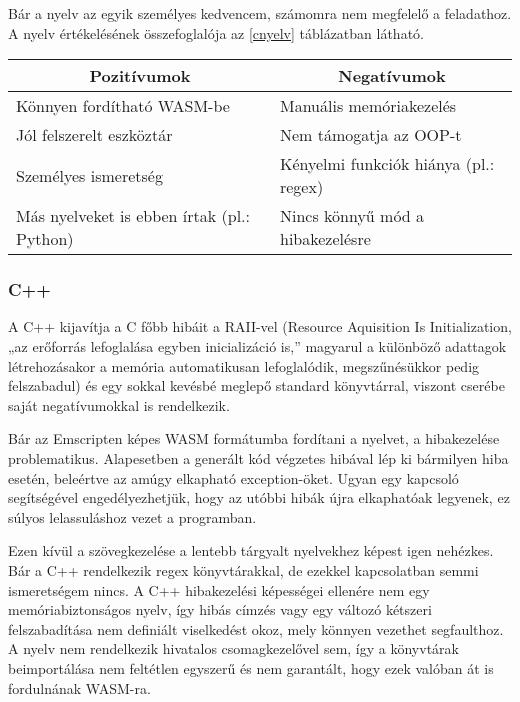 Bár a nyelv az egyik személyes kedvencem, számomra nem megfelelő a feladathoz. A nyelv értékelésének összefoglalója az \ref{cnyelv} táblázatban látható.

\begin{center}
  \begin{tabularx}{\textwidth}{X X}
    \hline
    \multicolumn{1}{c}{\bfseries{Pozitívumok}} & \multicolumn{1}{c}{\bfseries{Negatívumok}}                                  \\
    \hline
    Könnyen fordítható WASM-be                 & Manuális memóriakezelés                                                     \\
    Jól felszerelt eszköztár                   & Nem támogatja az OOP-t \\
    Személyes ismeretség                       & Kényelmi funkciók hiánya (pl.: regex) \\
    Más nyelveket is ebben írtak (pl.: Python) & Nincs könnyű mód a hibakezelésre \\
    \hline
  \end{tabularx}
\end{center}

\subsubsection{C++}

A C++ kijavítja a C főbb hibáit a RAII-vel (Resource Aquisition Is Initialization\cite{raii}, „az erőforrás lefoglalása egyben inicializáció is,” magyarul a különböző adattagok létrehozásakor a memória automatikusan lefoglalódik, megszűnésükkor pedig felszabadul) és egy sokkal kevésbé meglepő standard könyvtárral, viszont cserébe saját negatívumokkal is rendelkezik.

Bár az Emscripten képes WASM formátumba fordítani a nyelvet, a hibakezelése problematikus. Alapesetben a generált kód végzetes hibával lép ki bármilyen hiba esetén, beleértve az amúgy elkapható exception-öket. Ugyan egy kapcsoló segítségével engedélyezhetjük, hogy az utóbbi hibák újra elkaphatóak legyenek, ez súlyos lelassuláshoz vezet a programban.\cite{slowdown}

Ezen kívül a szövegkezelése a lentebb tárgyalt nyelvekhez képest igen nehézkes. Bár a C++ rendelkezik regex könyvtárakkal, de ezekkel kapcsolatban semmi ismeretségem nincs. A C++ hibakezelési képességei ellenére nem egy memóriabiztonságos nyelv, így hibás címzés vagy egy változó kétszeri felszabadítása nem definiált viselkedést okoz\cite{cppundefined}, mely könnyen vezethet segfaulthoz. A nyelv nem rendelkezik hivatalos csomagkezelővel sem, így a könyvtárak beimportálása nem feltétlen egyszerű és nem garantált, hogy ezek valóban át is fordulnának WASM-ra.

